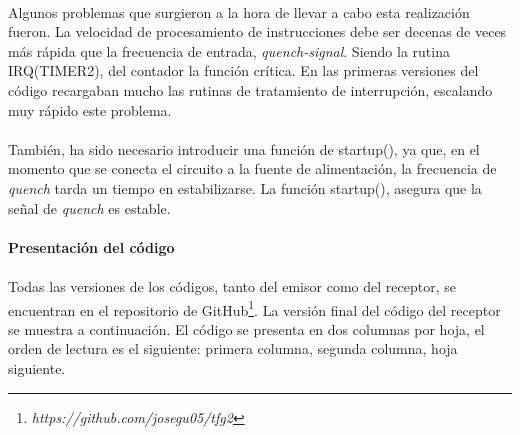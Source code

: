 \paragraph{}
Algunos problemas que surgieron a la hora de llevar a cabo esta realización fueron.
La velocidad de procesamiento de instrucciones debe ser decenas de veces más rápida que la frecuencia de entrada, \textit{quench-signal}. Siendo la rutina IRQ(TIMER2), del contador la función crítica.
En las primeras versiones del código recargaban mucho las rutinas de tratamiento de interrupción, escalando muy rápido este problema.
\paragraph{}
También, ha sido necesario introducir una función de startup(), ya que, en el momento que se conecta el circuito a la fuente de alimentación, la frecuencia de \textit{quench} tarda un tiempo en estabilizarse. La función startup(), asegura que la señal de \textit{quench} es estable.


\paragraph{Presentaci\'on del c\'odigo}
\paragraph{}
Todas las versiones de los c\'odigos, tanto del emisor como del receptor, se encuentran en el repositorio de GitHub\footnote{\textit{https://github.com/josegu05/tfg2}}. La versi\'on final del c\'odigo del receptor se muestra a continuaci\'on. El c\'odigo se presenta en dos columnas por hoja, el orden de lectura es el siguiente: primera columna, segunda columna, hoja siguiente.

\begin{multicols}{2}

\end{multicols}
